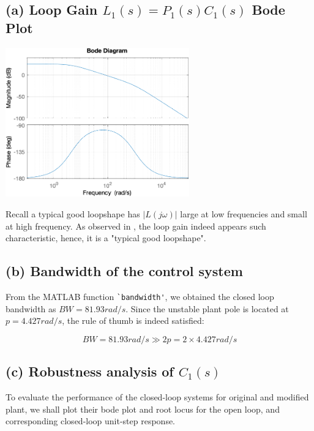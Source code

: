 \documentclass{tron}
\begin{document}
\subsection{(a) Loop Gain $L_1(s) = P_1(s) C_1(s)$ Bode Plot \label{ans:P2-a}}
		{	
			\centering\includegraphics[width=300px]{../matlab/output/q2/bode_plot_L1}
		}
		
		Recall a typical good loopshape has $|L(j\omega)|$ large at low frequencies and small at high frequency. As observed in , the loop gain indeed appears such characteristic, hence, it is a "typical good loopshape".

\subsection{(b) Bandwidth of the control system \label{ans:P2-b}}
	From the MATLAB function \verb|`bandwidth'|, we obtained the closed loop bandwidth as $BW = 81.93 \unit{rad/s}$. Since the unstable plant pole is located at $p=4.427 \unit{rad/s}$, the rule of thumb is indeed satisfied:
	
	\begin{equation}
		BW = 81.93 \unit{rad/s} \gg 2p = 2 \times 4.427 \unit{rad/s}
	\end{equation}

\newpage
\subsection{(c) Robustness analysis of $C_1(s)$ \label{ans:P2-c}}
	To evaluate the performance of the closed-loop systems for original and modified plant, we shall plot their bode plot and root locus for the open loop, and corresponding closed-loop unit-step response.
	
\end{document}
